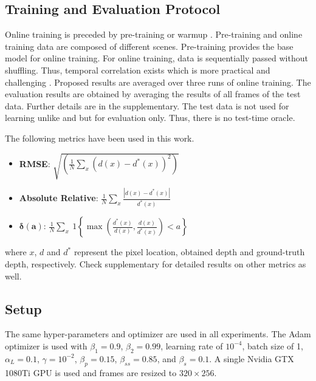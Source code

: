 \documentclass[lettersize,journal]{IEEEtran}
\begin{document}
 \subsection{Training and Evaluation Protocol}
 \noindent Online training is preceded by pre-training or warmup \cite{hayes2020remind}. Pre-training and online training data are composed of different scenes. Pre-training provides the base model for online training. For online training, data is sequentially passed without shuffling. Thus, temporal correlation exists which is more practical and challenging \cite{chrysakis2020online}. Proposed results are averaged over three runs of online training. The evaluation results are obtained by averaging the results of all frames of the test data. Further details are in the supplementary. The test data is not used for learning unlike \cite{zhang2020online} and \cite{tonioni2019learning} but for evaluation only. Thus, there is no test-time oracle. 
 
 The following metrics have been used in this work. 
  \begin{itemize} 
    \item \textbf{RMSE}: $\sqrt{\left(\frac{1}{N}\sum_x(d(x) - d^*(x))^2\right)}$
    \item \textbf{Absolute Relative}: $\frac{1}{N}\sum_x\frac{\left|d(x) - d^*(x)\right|}{d^*(x)}$
    \item $\boldsymbol{\delta(a)}$: $\frac{1}{N}\sum_x~1\left\{\max\left(\frac{d^*(x)}{d(x)}, \frac{d(x)}{d^*(x)}\right) < a\right\}$
 \end{itemize}
 where $x$, $d$ and $d^*$ represent the pixel location, obtained depth and ground-truth depth, respectively. Check supplementary for detailed results on other metrics as well. 
 
 \subsection{Setup}
 \noindent The same hyper-parameters and optimizer are used in all experiments. The Adam optimizer \cite{kingma2014adam} is used with $\beta_1 = 0.9$, $\beta_2 = 0.99$, learning rate of $10^{-4}$, batch size of 1, $\alpha_L = 0.1$, $\gamma = 10^{-2}$, $\beta_{p} = 0.15$, $\beta_{ss} = 0.85$, and $\beta_{s} = 0.1$. A single Nvidia GTX 1080Ti GPU is used and frames are resized to $320 \times 256$. 
 
\end{document}
